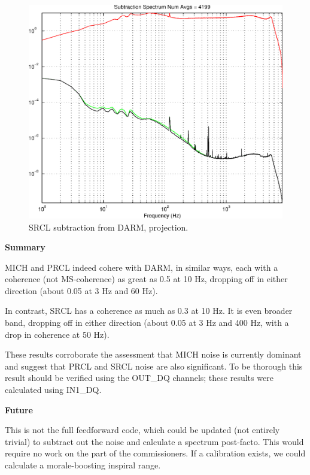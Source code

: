 \begin{figure}
\begin{center}
\includegraphics[width=0.4\paperwidth,height=0.3\paperheight]{SubtractionSpectrum-SRCL.eps}
\caption{
SRCL subtraction from DARM, projection.
}
\end{center}
\end{figure}

\textbf{Summary}

MICH and PRCL indeed cohere with DARM, in similar ways, each with a coherence (not MS-coherence) as great as 0.5 at 10 Hz, dropping off in either direction (about 0.05 at 3 Hz and 60 Hz).

In contrast, SRCL has a coherence as much as 0.3 at 10 Hz. It is even broader band, dropping off in either direction (about 0.05 at 3 Hz and 400 Hz, with a drop in coherence at 50 Hz).

These results corroborate the assessment that MICH noise is currently dominant and suggest that PRCL and SRCL noise are also significant. 
To be thorough this result should be verified using the OUT\_DQ channels; these results were calculated using IN1\_DQ.

\textbf{Future}

This is not the full feedforward code, which could be updated (not entirely trivial) to subtract out the noise and calculate a spectrum post-facto. This would require no work on the part of the commissioners. If a calibration exists, we could calculate a morale-boosting inspiral range.

